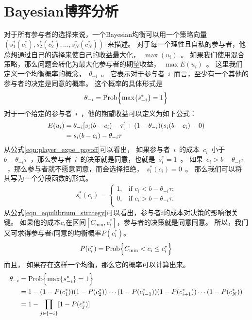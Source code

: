 \section{Bayesian博弈分析}
对于所有参与者的选择来说，一个Bayesian均衡可以用一个策略向量~$( s_1^*(c_1^*), s_2^*(c_2^*), \ldots, s_N^*(c_N^*) )$~来描述。
对于每一个理性且自私的参与者，他总想通过自己的选择来使自己的收益最大化，~$\max(u_i)$~。
如果我们使用混合策略，那么问题会转化为最大化参与者的期望收益，~$\max{E(u_i)}$~。
这里我们定义一个均衡概率的概念，~$\theta_{-i}$~。
它表示对于参与者~$i$~而言，至少有一个其他的参与者的决定是同意的概率。
这个概率的具体形式是
\begin{equation}
    \theta_{-i} = \hbox{Prob} \Bigl\{ \max\{ s_{-i}^*\} = 1 \Bigr\} 
    \label{eqn_at_least_one_probability} 
\end{equation}
对于一个给定的参与者~$i$~，他的期望收益可以定义为如下公式：
\begin{align}
     E(u_i) &= \theta_{-i} [s_i(b-c_i) -\tau] + (1-\theta_{-i}) (s_i(b-c_i) - 0) \notag\\ 
     &= s_i(b-c_i) - \theta_{-i}\tau
    \label{eqn:player_expe_payoff}
\end{align}
从公式\ref{eqn:player_expe_payoff}可以看出，
如果参与者~$i$~的成本~$c_i$~小于~$b-\theta_{-i}\tau$~，那么参与者~$i$~的决策就是同意，也就是~$s_{i}^*=1$~。
如果~$c_i > b - \theta_{-i} \tau$~，那么参与者就不愿意同意，而会选择拒绝，~$s_i^*(c_i) = 0$~。
那么我们可以将其写为一个分段函数的形式。
\begin{align}
    s_i^*(c_i) = \begin{cases} 1, &\text{if $c_i < b -\theta_{-i}\tau$;}\\
        0, &\text{if $c_i > b -\theta_{-i}\tau$.}\\ \end{cases} 
    \label{eqn_equilibrium_strategy} 
\end{align}
从公式\ref{eqn_equilibrium_strategy}可以看出，参与者$i$的成本对决策的影响很关键。
如果他的成本$c_i$在区间$ [C_{\min}, c_i^*] $，参与者的决策就是同意同意。
所以，我们又可求得参与者$i$同意的均衡概率$P(c_i^*)$。
\begin{align}
    P(c_i^*) = \hbox{Prob} \Bigl\{ C_{\min} < c_i \leq c_i^* \Bigr\} 
    \label{eqn:equil_prob_c_i}
\end{align}
而且，
如果存在这样一个均衡，那么它的概率可以计算出来。
\begin{align*} 
    \theta_{-i} &= \hbox{Prob} \Bigl\{ \max\{ s_{-i}^*\} = 1 \Bigr\} \\ 
    &= 1- (1-P(c_1^*))(1-P(c_2^*))\cdots(1-P(c_{i-1}^*)) (1-P(c_{i+1}^*)) \cdots(1-P(c_N^*)) \\ 
    &= 1- \prod_{j\in\{-i\}} [1-P(c_j^*)] 
\end{align*}
